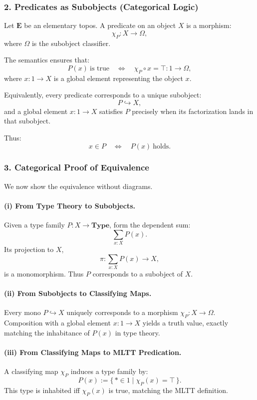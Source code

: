 \documentclass[12pt,letterpaper]{article}
\begin{document}
\subsubsection*{2. Predicates as Subobjects (Categorical Logic)}

Let $\mathbf{E}$ be an elementary topos.  
A predicate on an object $X$ is a morphism:
\[
\chi_P : X \to \Omega,
\]
where $\Omega$ is the subobject classifier.

The semantics ensures that:
\[
P(x)\ \text{is true} 
\quad\Longleftrightarrow\quad 
\chi_P \circ x = \top : 1 \to \Omega,
\]
where $x : 1 \to X$ is a global element representing the object $x$.

Equivalently, every predicate corresponds to a unique subobject:
\[
P \hookrightarrow X,
\]
and a global element $x : 1 \to X$ satisfies $P$ precisely when its factorization
lands in that subobject.

Thus:
\[
x \in P 
\quad\Longleftrightarrow\quad
P(x)\ \text{holds}.
\]

\subsubsection*{3. Categorical Proof of Equivalence}

We now show the equivalence without diagrams.

\paragraph{(i) From Type Theory to Subobjects.}
Given a type family $P : X \to \mathbf{Type}$, form the dependent sum:
\[
\sum_{x:X} P(x).
\]
Its projection to $X$,
\[
\pi : \sum_{x:X} P(x) \to X,
\]
is a monomorphism.  Thus $P$ corresponds to a subobject of $X$.

\paragraph{(ii) From Subobjects to Classifying Maps.}
Every mono $P \hookrightarrow X$ uniquely corresponds to a morphism
$\chi_P : X \to \Omega$.  Composition with a global element $x : 1 \to X$ yields
a truth value, exactly matching the inhabitance of $P(x)$ in type theory.

\paragraph{(iii) From Classifying Maps to MLTT Predication.}
A classifying map $\chi_P$ induces a type family by:
\[
P(x) := \{\, * \in 1 \mid \chi_P(x) = \top \,\}.
\]
This type is inhabited iff $\chi_P(x)$ is true, matching the MLTT definition.
\end{document}
